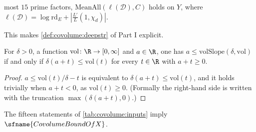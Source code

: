 \begin{definition}
\begin{enumerate}[label=(\alph*)]
  most $15$ prime factors, $\mathrm{MeanAll}(\ell(\mathcal D),C)$ holds on $Y$, where
  $\ell(\mathcal D)=\log\mathrm{rd}_E+|\frac{L'}{L}(1,\chi_d)|$.
\end{enumerate}
This makes \cref{def:covolume:deepstr} of Part I explicit.
%
%
%
%
\end{definition}

\begin{lemma}\label{pf:covol:lem:volslope}
For $\delta>0$, a function $\mathrm{vol}\colon\R\to[0,\infty]$ and $a\in\R$, one has
$a\le\mathrm{volSlope}(\delta,\mathrm{vol})$ if and only if $\delta(a+t)\le\mathrm{vol}(t)$ for every
$t\in\R$ with $a+t\ge0$.
\end{lemma}

\begin{proof}
$a\le\mathrm{vol}(t)/\delta-t$ is equivalent to $\delta(a+t)\le\mathrm{vol}(t)$, and it holds trivially when
$a+t<0$, as $\mathrm{vol}(t)\ge0$. (Formally the right-hand side is written with the truncation
$\max(\delta(a+t),0)$.)
\end{proof}

\begin{theorem}\label{pf:covol:thm:covol}
The fifteen statements of \cref{tab:covolume:inputs} imply $\sfname{CovolumeBoundOfX}$.
\end{theorem}

